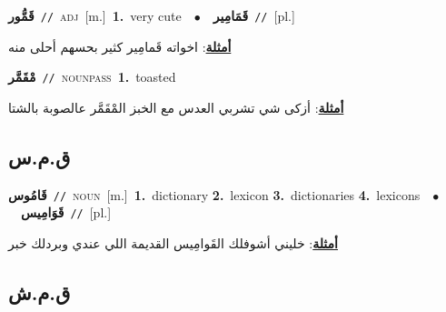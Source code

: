 \documentclass[10pt,a4paper,twoside]{article} %
\begin{document}
\begin{multicols}{2}
{\setlength\topsep{0pt}\textbf{\foreignlanguage{arabic}{قَمُّور}}\ {\color{gray}\texttt{//}\color{black}}\ \textsc{adj}\ [m.]\ \textbf{1.}~very cute\ \ $\bullet$\ \ \setlength\topsep{0pt}\textbf{\foreignlanguage{arabic}{قَمَامِير}}\ {\color{gray}\texttt{//}\color{black}}\ [pl.]\  \begin{flushright}\color{gray}\foreignlanguage{arabic}{\textbf{\underline{\foreignlanguage{arabic}{أمثلة}}}: اخواته قَمامِير كثير بحسهم أحلى منه}\end{flushright}\color{black}} \vspace{2mm}

{\setlength\topsep{0pt}\textbf{\foreignlanguage{arabic}{مْقَمَّر}}\ {\color{gray}\texttt{//}\color{black}}\ \textsc{noun\textunderscore pass}\ \textbf{1.}~toasted\  \begin{flushright}\color{gray}\foreignlanguage{arabic}{\textbf{\underline{\foreignlanguage{arabic}{أمثلة}}}: أزكى شي تشربي العدس مع الخبز المْقَمَّر عالصوبة بالشتا}\end{flushright}\color{black}} \vspace{2mm}

\vspace{-3mm}
\subsection*{\color{blue}\foreignlanguage{arabic}{ق.م.س}\color{blue}{}} 

{\setlength\topsep{0pt}\textbf{\foreignlanguage{arabic}{قَامُوس}}\ {\color{gray}\texttt{//}\color{black}}\ \textsc{noun}\ [m.]\ \textbf{1.}~dictionary  \textbf{2.}~lexicon  \textbf{3.}~dictionaries  \textbf{4.}~lexicons\ \ $\bullet$\ \ \setlength\topsep{0pt}\textbf{\foreignlanguage{arabic}{قَوَامِيس}}\ {\color{gray}\texttt{//}\color{black}}\ [pl.]\  \begin{flushright}\color{gray}\foreignlanguage{arabic}{\textbf{\underline{\foreignlanguage{arabic}{أمثلة}}}: خليني أشوفلك القَوامِيس القديمة اللي عندي وبردلك خبر}\end{flushright}\color{black}} \vspace{2mm}

\vspace{-3mm}
\subsection*{\color{blue}\foreignlanguage{arabic}{ق.م.ش}\color{blue}{}} 


\end{multicols}
\end{document}
